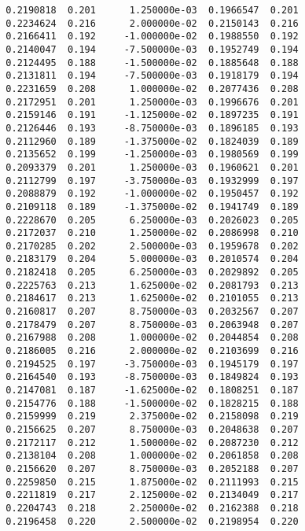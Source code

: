 \documentclass[
  letterpaper,
  DIV=11,
  numbers=noendperiod]{scrartcl}
\begin{document}
\begin{verbatim}
  0.2190818  0.201      1.250000e-03  0.1966547  0.201           
  0.2234624  0.216      2.000000e-02  0.2150143  0.216           
  0.2166411  0.192     -1.000000e-02  0.1988550  0.192           
  0.2140047  0.194     -7.500000e-03  0.1952749  0.194           
  0.2124495  0.188     -1.500000e-02  0.1885648  0.188           
  0.2131811  0.194     -7.500000e-03  0.1918179  0.194           
  0.2231659  0.208      1.000000e-02  0.2077436  0.208           
  0.2172951  0.201      1.250000e-03  0.1996676  0.201           
  0.2159146  0.191     -1.125000e-02  0.1897235  0.191           
  0.2126446  0.193     -8.750000e-03  0.1896185  0.193           
  0.2112960  0.189     -1.375000e-02  0.1824039  0.189           
  0.2135652  0.199     -1.250000e-03  0.1980569  0.199           
  0.2093379  0.201      1.250000e-03  0.1960621  0.201           
  0.2112799  0.197     -3.750000e-03  0.1932999  0.197           
  0.2088879  0.192     -1.000000e-02  0.1950457  0.192           
  0.2109118  0.189     -1.375000e-02  0.1941749  0.189           
  0.2228670  0.205      6.250000e-03  0.2026023  0.205           
  0.2172037  0.210      1.250000e-02  0.2086998  0.210           
  0.2170285  0.202      2.500000e-03  0.1959678  0.202           
  0.2183179  0.204      5.000000e-03  0.2010574  0.204           
  0.2182418  0.205      6.250000e-03  0.2029892  0.205           
  0.2225763  0.213      1.625000e-02  0.2081793  0.213           
  0.2184617  0.213      1.625000e-02  0.2101055  0.213           
  0.2160817  0.207      8.750000e-03  0.2032567  0.207           
  0.2178479  0.207      8.750000e-03  0.2063948  0.207           
  0.2167988  0.208      1.000000e-02  0.2044854  0.208           
  0.2186005  0.216      2.000000e-02  0.2103699  0.216           
  0.2194525  0.197     -3.750000e-03  0.1945179  0.197           
  0.2164540  0.193     -8.750000e-03  0.1849824  0.193           
  0.2147081  0.187     -1.625000e-02  0.1808251  0.187           
  0.2154776  0.188     -1.500000e-02  0.1828215  0.188           
  0.2159999  0.219      2.375000e-02  0.2158098  0.219           
  0.2156625  0.207      8.750000e-03  0.2048638  0.207           
  0.2172117  0.212      1.500000e-02  0.2087230  0.212           
  0.2138104  0.208      1.000000e-02  0.2061858  0.208           
  0.2156620  0.207      8.750000e-03  0.2052188  0.207           
  0.2259850  0.215      1.875000e-02  0.2111993  0.215           
  0.2211819  0.217      2.125000e-02  0.2134049  0.217           
  0.2204743  0.218      2.250000e-02  0.2162388  0.218           
  0.2196458  0.220      2.500000e-02  0.2198954  0.220           

\end{verbatim}
\end{document}
